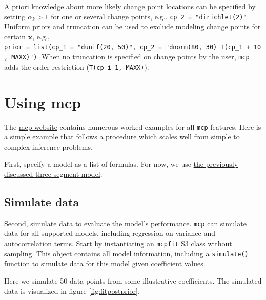 \documentclass[
  american,
]{article}
\begin{document}
A priori knowledge about more likely change point locations can be specified by setting \(\alpha_k > 1\) for one or several change points, e.g., \texttt{cp\_2\ =\ "dirichlet(2)"}. Uniform priors and truncation can be used to exclude modeling change points for certain \(\mathbf{x}\), e.g., \texttt{prior\ =\ list(cp\_1\ =\ "dunif(20,\ 50)",\ cp\_2\ =\ "dnorm(80,\ 30)\ T(cp\_1\ +\ 10,\ MAXX)")}. When no truncation is specified on change points by the user, \texttt{mcp} adds the order restriction (\texttt{T(cp\_i-1,\ MAXX)}).

\hypertarget{using-mcp}{%
\section{Using mcp}\label{using-mcp}}

The \href{http://lindeloev.github.io/mcp/}{mcp website} contains numerous worked examples for all \texttt{mcp} features. Here is a simple example that follows a procedure which scales well from simple to complex inference problems.

First, specify a model as a list of formulas. For now, we use \protect\hyperlink{segments_api}{the previously discussed three-segment model}.

\hypertarget{simulate}{%
\subsection{Simulate data}\label{simulate}}

Second, simulate data to evaluate the model's performance. \texttt{mcp} can simulate data for all supported models, including regression on variance and autocorrelation terms. Start by instantiating an \texttt{mcpfit} S3 class without sampling. This object contains all model information, including a \texttt{simulate()} function to simulate data for this model given coefficient values.

Here we simulate 50 data points from some illustrative coefficients. The simulated data is visualized in figure \ref{fig:fitpostprior}.
\end{document}
